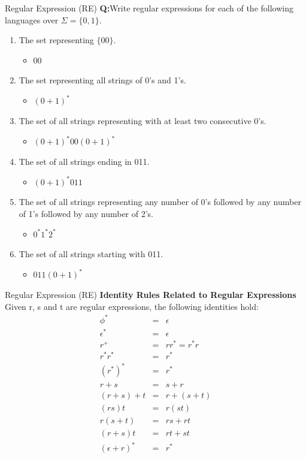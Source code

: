 \documentclass{beamer}
\begin{document}
\begin{frame}{Regular Expression (RE)}
	\textbf{Q:}Write regular expressions for each of the following languages over 
	$\Sigma=\{0, 1\}$.

	\begin{enumerate}
		\item The set representing $\{00\}$. 
		\begin{itemize}
			\item $00 $
		\end{itemize}
		
		\item The set representing all strings of 0's and 1's.
		\begin{itemize}
			\item $(0+1)^*$
		\end{itemize}
		\item The set of all strings representing with at least two consecutive 0’s. 
	\begin{itemize}
		\item $	(0 + 1)^*00(0 + 1)^*$
	\end{itemize}
	\item The set of all strings ending in 011.
		\begin{itemize}
			\item $(0 + 1)^*011$
		\end{itemize}
	\item The set of all strings representing any number of 0's followed by any 
		number of 1’s followed by any number of 2's.
		\begin{itemize}
			\item $0^*1^*2^*$
		\end{itemize}
	\item The set of all strings starting with 011.
	\begin{itemize}
		\item $	011 (0 + 1)^*$
	\end{itemize}
	\end{enumerate}
\end{frame}
\begin{frame}{Regular Expression (RE)}
\textbf{Identity Rules Related to Regular Expressions}
\\ Given r, s and t are regular expressions, the following identities hold:
\begin{eqnarray*}
	\phi^* &=& \epsilon\\
	 \epsilon^* &=& \epsilon\\
	 r^+ &=& rr^* = r^*r\\
	 r^*r^* &=& r^*\\
	 (r^*)^* &=& r^*\\
	 r + s &=& s + r\\
	 (r + s) + t &=& r + (s + t)\\
	 (rs)t &=& r(st)\\
	 r(s + t) &=& rs + rt\\
	 (r + s)t &=& rt + st\\
	 (\epsilon + r)^* &=& r^*\\
\end{eqnarray*}
\end{frame}
\end{document}
